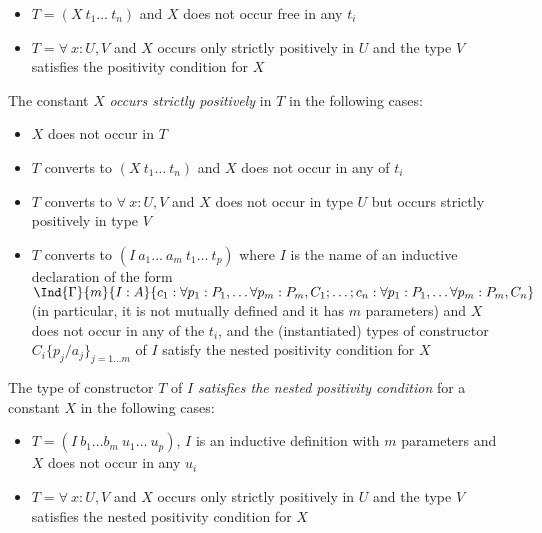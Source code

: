 \begin{itemize}
\item $T=(X~t_1\ldots ~t_n)$ and $X$ does not occur free in
any $t_i$
\item $T=\forall~x:U,V$ and $X$ occurs only strictly positively in $U$ and
the type $V$ satisfies the positivity condition for $X$
\end{itemize}

The constant $X$ {\em occurs strictly positively} in $T$ in the
following cases:

\begin{itemize}
\item $X$ does not occur in $T$
\item $T$ converts to $(X~t_1 \ldots ~t_n)$ and $X$ does not occur in
  any of $t_i$
\item $T$ converts to $\forall~x:U,V$ and $X$ does not occur in
  type $U$ but occurs strictly positively in type $V$
\item $T$ converts to $(I~a_1 \ldots ~a_m ~ t_1 \ldots ~t_p)$ where
  $I$ is the name of an inductive declaration of the form
  $\Ind{\Gamma}{m}{I:A}{c_1:\forall p_1:P_1,\ldots \forall
    p_m:P_m,C_1;\ldots;c_n:\forall p_1:P_1,\ldots \forall
    p_m:P_m,C_n}$ 
  (in particular, it is not mutually defined and it has $m$
  parameters) and $X$ does not occur in any of the $t_i$, and the
  (instantiated) types of constructor $C_i\{p_j/a_j\}_{j=1\ldots m}$
  of $I$ satisfy 
  the nested positivity condition for $X$
\end{itemize}

The type of constructor $T$ of $I$ {\em satisfies the nested
positivity condition} for a constant $X$ in the following
cases:

\begin{itemize}
\item $T=(I~b_1\ldots b_m~u_1\ldots ~u_{p})$, $I$ is an inductive
  definition with $m$ parameters and $X$ does not occur in
any $u_i$
\item $T=\forall~x:U,V$ and $X$ occurs only strictly positively in $U$ and
the type $V$ satisfies the nested positivity condition for $X$
\end{itemize}

